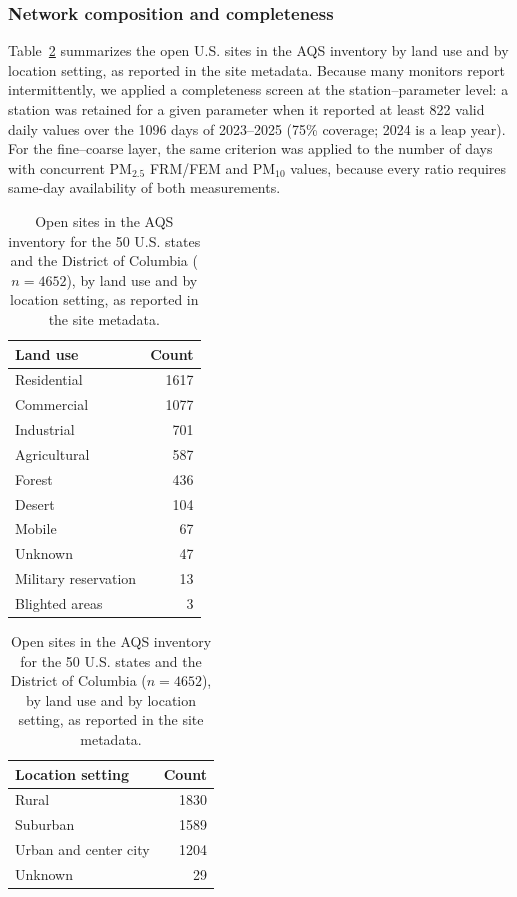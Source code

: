 \documentclass[a4paper,fleqn]{cas-sc}
\begin{document}
\subsubsection*{Network composition and completeness}

Table~\ref{tab:stations_counts} summarizes the open U.S. sites in the AQS inventory by land use and by location setting, as reported in the site metadata. Because many monitors report intermittently, we applied a completeness screen at the station--parameter level: a station was retained for a given parameter when it reported at least 822 valid daily values over the 1096 days of 2023--2025 (75\% coverage; 2024 is a leap year). For the fine--coarse layer, the same criterion was applied to the number of days with concurrent PM$_{2.5}$ FRM/FEM and PM$_{10}$ values, because every ratio requires same-day availability of both measurements.

\begin{table}[!htbp]
\centering
\caption{Open sites in the AQS inventory for the 50 U.S. states and the District of Columbia ($n=4652$), by land use and by location setting, as reported in the site metadata.}
\label{tab:stations_counts}
\begin{minipage}{0.48\linewidth}
\centering
\begin{tabular}{lr}
\toprule
\textbf{Land use} & \textbf{Count} \\
\midrule
Residential & 1617 \\
Commercial & 1077 \\
Industrial & 701 \\
Agricultural & 587 \\
Forest & 436 \\
Desert & 104 \\
Mobile & 67 \\
Unknown & 47 \\
Military reservation & 13 \\
Blighted areas & 3 \\
\bottomrule
\end{tabular}
\end{minipage}\hfill
\begin{minipage}{0.48\linewidth}
\centering
\begin{tabular}{lr}
\toprule
\textbf{Location setting} & \textbf{Count} \\
\midrule
Rural & 1830 \\
Suburban & 1589 \\
Urban and center city & 1204 \\
Unknown & 29 \\
\bottomrule
\end{tabular}
\end{minipage}
\end{table}
\end{document}
